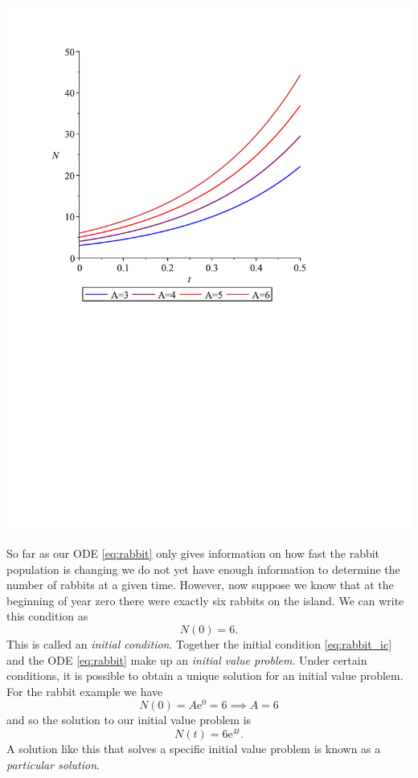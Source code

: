         \begin{center}
        \includegraphics[scale=0.6]{sols-crop.pdf}
        \end{center}

So far as our ODE \eqref{eq:rabbit} only gives information on how fast the rabbit population is changing we do not yet have enough information to determine the number of rabbits at a given time. However, now suppose we know that at the beginning of year zero there were exactly six rabbits on the island. We can write this condition as 
\begin{equation}\label{eq:rabbit_ic}
 N(0)=6.
\end{equation}
This is called an {\em initial condition}. Together the initial condition \eqref{eq:rabbit_ic} and the ODE \eqref{eq:rabbit} make up an {\em initial value problem}. Under certain conditions, it is possible to obtain a unique solution for an initial value problem. For the rabbit example we have
\begin{equation*}
 N(0)=A\text{e}^{0}=6 \implies A=6
\end{equation*}
and so the solution to our initial value problem is
\begin{equation*}
 N(t)=6\text{e}^{4t}.
\end{equation*}
A solution like this that solves a specific initial value problem is known as a {\em particular solution}.

